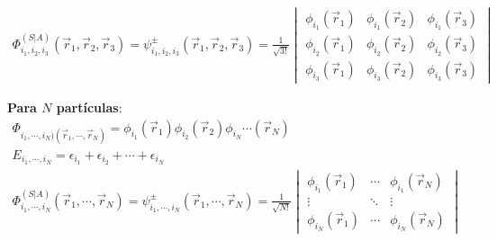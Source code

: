 \documentclass{article}
\begin{document}
\hfill 

\hfill 

\begin{gather*}
  \Phi ^ {(S|A ) } _{i_1 , i _2, i_3 } (\vec r _ 1, \vec r_2, \vec r_3 ) = \psi ^ {\pm } _{i_1,i_2, i_3 } (\vec r_1, \vec r_2 , \vec r_3) = \frac{1}{\sqrt{3! } } 
  \begin{vmatrix}
      \phi _{i_1 } (\vec r_1 ) & \phi _{i_1 } (\vec r_2 ) & \phi _{i_1 } (\vec r_3 )  \\
      \phi _{i_2 } (\vec r_1 ) & \phi _{i_2 } (\vec r_2 ) & \phi _{i_2 } (\vec r_3 )  \\
      \phi _{i_3 } (\vec r_1 ) & \phi _{i_3 } (\vec r_2 ) & \phi _{i_3 } (\vec r_3 ) 
  \end{vmatrix}  
\end{gather*}

\hfill 

\hfill 

\hfill 

\textbf{Para $ N  $ partículas}: 
\begin{gather*}
  \Phi _{i_1,\cdots, i_N)(\vec r_1, \cdots, \vec r_N )} = \phi _{i_1 } (\vec r_1 ) \phi _{i_2 } (\vec r_2 )\phi _{i_N } \cdots (\vec r_N ) \\
  E _{i_1, \cdots, i_N } = \epsilon _{i_1 }  + \epsilon _{i_2 } + \cdots + \epsilon _{i_N } \\
  \Phi ^ {(S|A ) } _{i_1 , \cdots, i_N } (\vec r _ 1, \cdots, \vec r_N ) = \psi ^ {\pm } _{i_1,\cdots, i_N } (\vec r_1,\cdots , \vec r_N) = \frac{1}{\sqrt{N! } } 
  \begin{vmatrix}
      \phi _{i_1 } (\vec r_1 ) & \cdots & \phi _{i_1 } (\vec r_N )  \\
      \vdots & \ddots & \vdots  \\
      \phi _{i_N } (\vec r_1 ) & \cdots & \phi _{i_N } (\vec r_N ) 
  \end{vmatrix}  
\end{gather*}
\end{document}
